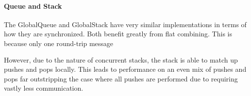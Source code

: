 \paragraph{Queue and Stack}
The GlobalQueue and GlobalStack have very similar implementations in terms of how they are synchronized. Both benefit greatly from flat combining. This is because only one round-trip message 

However, due to the nature of concurrent stacks, the stack is able to match up pushes and pops locally. This leads to performance on an even mix of pushes and pops far outstripping the case where all pushes are performed due to requiring vastly less communication.

